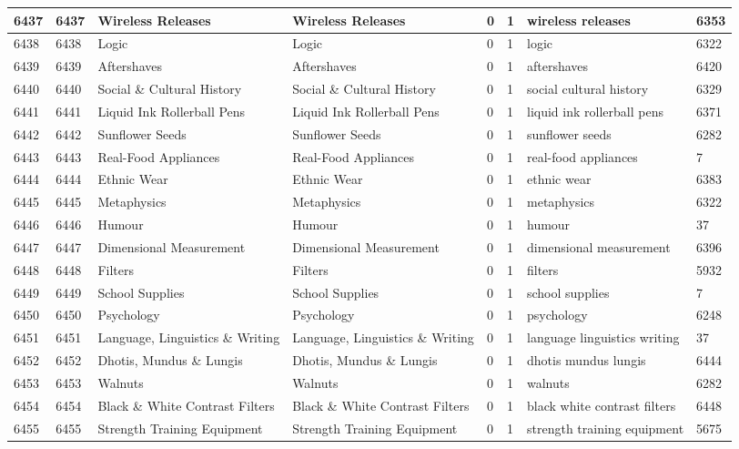 \begin{longtable}{|l|l|l|l|l|l|l|l|}
6437 & 6437 & Wireless Releases & Wireless Releases & 0 & 1 & wireless releases & 6353 \\ \hline 
6438 & 6438 & Logic & Logic & 0 & 1 & logic & 6322 \\ \hline 
6439 & 6439 & Aftershaves & Aftershaves & 0 & 1 & aftershaves & 6420 \\ \hline 
6440 & 6440 & Social \& Cultural History & Social \& Cultural History & 0 & 1 & social cultural history & 6329 \\ \hline 
6441 & 6441 & Liquid Ink Rollerball Pens & Liquid Ink Rollerball Pens & 0 & 1 & liquid ink rollerball pens & 6371 \\ \hline 
6442 & 6442 & Sunflower Seeds & Sunflower Seeds & 0 & 1 & sunflower seeds & 6282 \\ \hline 
6443 & 6443 & Real-Food Appliances & Real-Food Appliances & 0 & 1 & real-food appliances & 7 \\ \hline 
6444 & 6444 & Ethnic Wear & Ethnic Wear & 0 & 1 & ethnic wear & 6383 \\ \hline 
6445 & 6445 & Metaphysics & Metaphysics & 0 & 1 & metaphysics & 6322 \\ \hline 
6446 & 6446 & Humour & Humour & 0 & 1 & humour & 37 \\ \hline 
6447 & 6447 & Dimensional Measurement & Dimensional Measurement & 0 & 1 & dimensional measurement & 6396 \\ \hline 
6448 & 6448 & Filters & Filters & 0 & 1 & filters & 5932 \\ \hline 
6449 & 6449 & School Supplies & School Supplies & 0 & 1 & school supplies & 7 \\ \hline 
6450 & 6450 & Psychology & Psychology & 0 & 1 & psychology & 6248 \\ \hline 
6451 & 6451 & Language, Linguistics \& Writing & Language, Linguistics \& Writing & 0 & 1 & language linguistics writing & 37 \\ \hline 
6452 & 6452 & Dhotis, Mundus \& Lungis & Dhotis, Mundus \& Lungis & 0 & 1 & dhotis mundus lungis & 6444 \\ \hline 
6453 & 6453 & Walnuts & Walnuts & 0 & 1 & walnuts & 6282 \\ \hline 
6454 & 6454 & Black \& White Contrast Filters & Black \& White Contrast Filters & 0 & 1 & black white contrast filters & 6448 \\ \hline 
6455 & 6455 & Strength Training Equipment & Strength Training Equipment & 0 & 1 & strength training equipment & 5675 \\ \hline 

\end{longtable}
